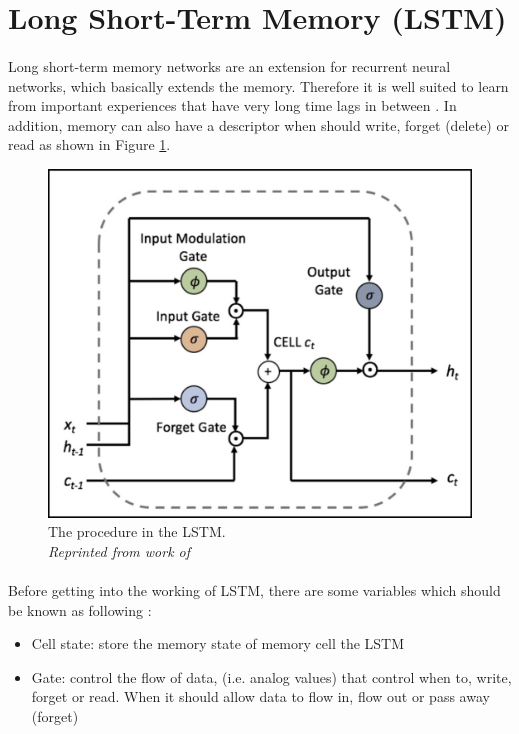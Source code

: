 \section{Long Short-Term Memory (LSTM)}
\paragraph{}
Long short-term memory networks are an extension for recurrent neural networks, which basically extends the memory. Therefore it is well suited to learn from important experiences that have very long time lags in between \cite{donges_2019,olah_2015}. In addition, memory can also have a descriptor when should write, forget (delete) or read as shown in  Figure \ref{fig:LSTM}.

\begin{figure}[H]
  \centering
  \caption[The procedure inside the LSTM.]{The procedure in the LSTM. \\\hspace{\textwidth} \emph{Reprinted from work of \citeauthor{sirinart_tangruamsub_2017} \citeyear{sirinart_tangruamsub_2017}}}\label{fig:LSTM}
  \includegraphics[scale = 0.3]{figures/LSTM.jpg}  
\end{figure}

\paragraph{}
Before getting into the working of LSTM, there are some variables which should be known as following \cite{sirinart_tangruamsub_2017}:
\begin{itemize}
\item Cell state: store the memory state of memory cell the LSTM
\item Gate: control the flow of data, (i.e. analog values) that control when to, write, forget or read. When it should allow data to flow in, flow out or pass away (forget)
\end{itemize}
